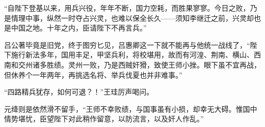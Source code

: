 “自陛下登基以来，用兵兴役，年年不断，国力空耗，而胜果寥寥。今日之败，乃是情理中事，纵然一时夺占兴灵，也难以保全长久——须知李继迁之前，兴灵却也是中国之地。十年之内，臣请陛下不再言兵。”

吕公著毕竟是旧党，终于图穷匕见，吕惠卿这一下就不能再与他统一战线了，“陛下施行新法多年，国用丰足，甲坚兵利，将校堪用，故而有河湟、荆南、横山、西南和交州诸多胜绩。灵州一败，乃是西贼奸猾，致使王师小挫。眼下虽不宜再战，但休养个一年两年，再挑选名将、举兵伐夏也并非难事。”

“四路精兵犹存，如何可退？！”王珪厉声喝问。

元绛则是依然滑不留手，“王师不幸败绩，与国事虽有小损，却幸无大碍。惟国中情势堪忧，臣望陛下对此稍作留意，以防流言，以及奸人作乱。”

